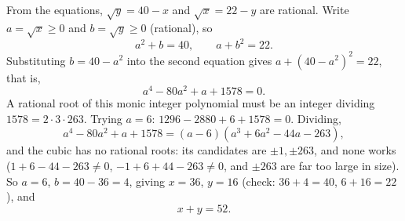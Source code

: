 From the equations, $\sqrt y=40-x$ and $\sqrt x=22-y$ are rational. Write $a=\sqrt x\ge0$ and $b=\sqrt y\ge0$ (rational), so
\[
a^2+b=40,\qquad a+b^2=22 .
\]
Substituting $b=40-a^2$ into the second equation gives $a+(40-a^2)^2=22$, that is,
\[
a^4-80a^2+a+1578=0 .
\]
A rational root of this monic integer polynomial must be an integer dividing $1578=2\cdot3\cdot263$. Trying $a=6$: $1296-2880+6+1578=0$. Dividing,
\[
a^4-80a^2+a+1578=(a-6)\left(a^3+6a^2-44a-263\right),
\]
and the cubic has no rational roots: its candidates are $\pm1,\pm263$, and none works ($1+6-44-263\ne0$, $-1+6+44-263\ne0$, and $\pm263$ are far too large in size). So $a=6$, $b=40-36=4$, giving $x=36$, $y=16$ (check: $36+4=40$, $6+16=22$), and
\[
x+y=\boxed{52}.
\]
